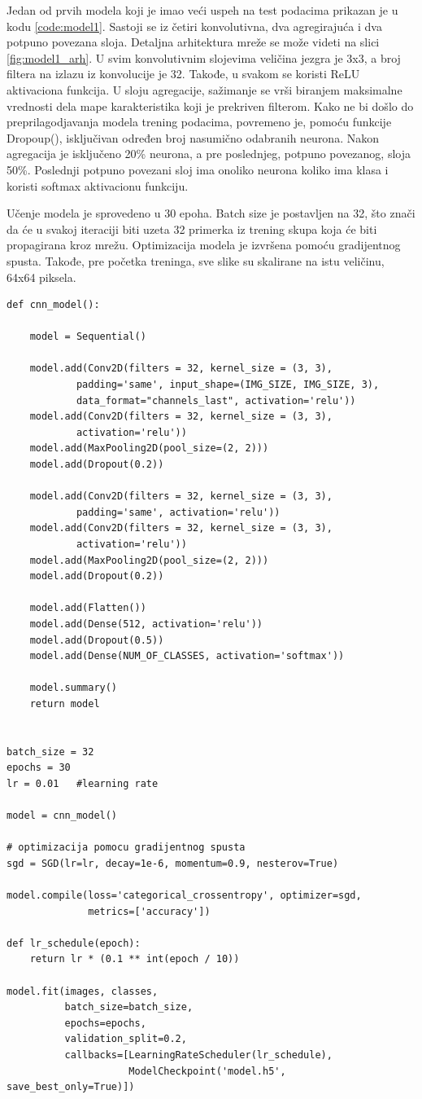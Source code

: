 \documentclass[a4paper]{article}
\begin{document}
Jedan od prvih modela koji je imao veći uspeh na test podacima prikazan je u kodu \ref{code:model1}. Sastoji se iz četiri konvolutivna, dva agregirajuća i dva potpuno povezana sloja. Detaljna arhitektura mreže se može videti na slici \ref{fig:model1_arh}. U svim konvolutivnim slojevima veličina jezgra je 3x3, a broj filtera na izlazu iz konvolucije je 32. Takođe, u svakom se koristi ReLU aktivaciona funkcija. U sloju agregacije, sažimanje se vrši biranjem maksimalne vrednosti dela mape karakteristika koji je prekriven filterom. Kako ne bi došlo do preprilagodjavanja modela trening podacima, povremeno je, pomoću funkcije Dropoup(), isključivan određen broj nasumično odabranih neurona. Nakon agregacija je isključeno 20\% neurona, a pre poslednjeg, potpuno povezanog, sloja 50\%. Poslednji potpuno povezani sloj ima onoliko neurona koliko ima klasa i koristi softmax aktivacionu funkciju.

Učenje modela je sprovedeno u 30 epoha. Batch size je postavljen na 32, što znači da će u svakoj iteraciji biti uzeta 32 primerka iz trening skupa koja će biti propagirana kroz mrežu. Optimizacija modela je izvršena pomoću gradijentnog spusta. Takođe, pre početka treninga, sve slike su skalirane na istu veličinu, 64x64 piksela.


\begin{lstlisting}[caption={Model 1},frame=single, label=code:model1]
def cnn_model():
    
    model = Sequential()

    model.add(Conv2D(filters = 32, kernel_size = (3, 3), 
    		padding='same', input_shape=(IMG_SIZE, IMG_SIZE, 3), 
    		data_format="channels_last", activation='relu'))
    model.add(Conv2D(filters = 32, kernel_size = (3, 3), 
    		activation='relu'))
    model.add(MaxPooling2D(pool_size=(2, 2)))
    model.add(Dropout(0.2))

    model.add(Conv2D(filters = 32, kernel_size = (3, 3), 
    		padding='same', activation='relu'))
    model.add(Conv2D(filters = 32, kernel_size = (3, 3), 
    		activation='relu'))
    model.add(MaxPooling2D(pool_size=(2, 2)))
    model.add(Dropout(0.2))
    
    model.add(Flatten())
    model.add(Dense(512, activation='relu'))
    model.add(Dropout(0.5))
    model.add(Dense(NUM_OF_CLASSES, activation='softmax'))
    
    model.summary()
    return model


batch_size = 32
epochs = 30
lr = 0.01   #learning rate

model = cnn_model()

# optimizacija pomocu gradijentnog spusta
sgd = SGD(lr=lr, decay=1e-6, momentum=0.9, nesterov=True)

model.compile(loss='categorical_crossentropy', optimizer=sgd, 
			  metrics=['accuracy'])

def lr_schedule(epoch):
    return lr * (0.1 ** int(epoch / 10))

model.fit(images, classes,
          batch_size=batch_size,
          epochs=epochs,
          validation_split=0.2,
          callbacks=[LearningRateScheduler(lr_schedule), 
          			 ModelCheckpoint('model.h5', save_best_only=True)])
\end{lstlisting}
\end{document}
